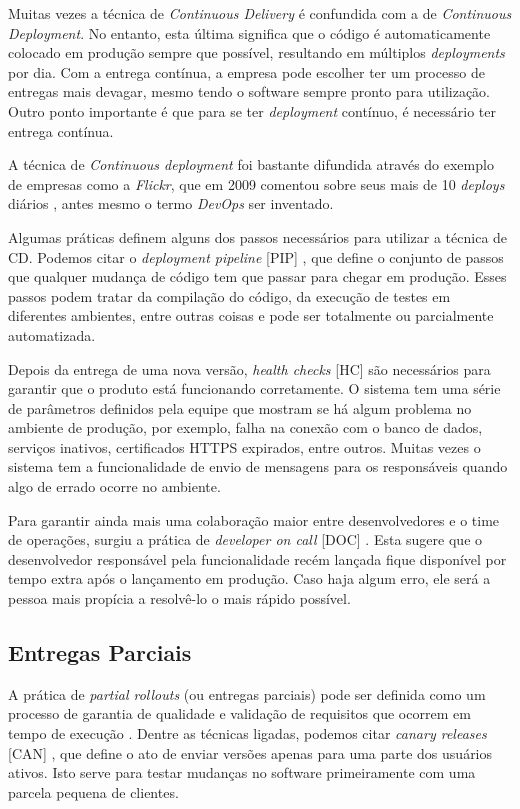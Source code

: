 Muitas vezes a técnica de \emph{Continuous Delivery} é confundida com a de \emph{Continuous Deployment}. No entanto, esta última significa que o código é automaticamente colocado em produção sempre que possível, resultando em múltiplos \emph{deployments} por dia. Com a entrega contínua, a empresa pode escolher ter um processo de entregas mais devagar, mesmo tendo o software sempre pronto para utilização. Outro ponto importante é que para se ter \emph{deployment} contínuo, é necessário ter entrega contínua.

A técnica de \emph{Continuous deployment} foi bastante difundida através do exemplo de empresas como a \emph{Flickr}, que em 2009 comentou sobre seus mais de 10 \emph{deploys} diários \cite{flickrTalk}, antes mesmo o termo \emph{DevOps} ser inventado. 

Algumas práticas definem alguns dos passos necessários para utilizar a técnica de CD. Podemos citar o \emph{deployment pipeline} [PIP] \cite{devopsBook}, que define o conjunto de passos que qualquer mudança de código tem que passar para chegar em produção. Esses passos podem tratar da compilação do código, da execução de testes em diferentes ambientes, entre outras coisas e pode ser totalmente ou parcialmente automatizada.

Depois da entrega de uma nova versão, \emph{health checks} [HC] \cite{devopsBook} são necessários para garantir que o produto está funcionando corretamente. O sistema tem uma série de parâmetros definidos pela equipe que mostram se há algum problema no ambiente de produção, por exemplo, falha na conexão com o banco de dados, serviços inativos, certificados HTTPS expirados, entre outros. Muitas vezes o sistema tem a funcionalidade de envio de mensagens para os responsáveis quando algo de errado ocorre no ambiente.

Para garantir ainda mais uma colaboração maior entre desenvolvedores e o time de operações, surgiu a prática de \emph{developer on call} [DOC] \cite{devAndDeploymentFB}. Esta sugere que o desenvolvedor responsável pela funcionalidade recém lançada fique disponível por tempo extra após o lançamento em produção. Caso haja algum erro, ele será a pessoa mais propícia a resolvê-lo o mais rápido possível.

\subsection{Entregas Parciais}
A prática de \emph{partial rollouts} (ou entregas parciais) pode ser definida como um processo de garantia de qualidade e validação de requisitos que ocorrem em tempo de execução \cite{empiricalStudy2016}. Dentre as técnicas ligadas, podemos citar \emph{canary releases} [CAN] \cite{continuousDeliveryBook}, que define o ato de enviar versões apenas para uma parte dos usuários ativos. Isto serve para testar mudanças no software primeiramente com uma parcela pequena de clientes.

